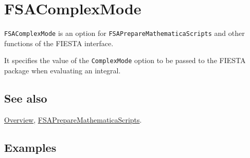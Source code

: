 \documentclass[../FeynHelpersManual.tex]{subfiles}
\begin{document}
\hypertarget{fsacomplexmode}{
\section{FSAComplexMode}\label{fsacomplexmode}}

\texttt{FSAComplexMode} is an option for
\texttt{FSAPrepareMathematicaScripts} and other functions of the FIESTA
interface.

It specifies the value of the \texttt{ComplexMode} option to be passed
to the FIESTA package when evaluating an integral.

\subsection{See also}

\hyperlink{toc}{Overview},
\hyperlink{fsapreparemathematicascripts}{FSAPrepareMathematicaScripts}.

\subsection{Examples}
\end{document}
